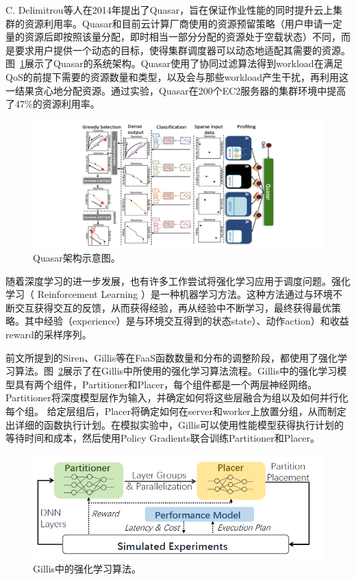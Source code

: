 C. Delimitrou等人在2014年提出了Quasar\parencite{delimitrou2014quasar}，旨在保证作业性能的同时提升云上集群的资源利用率。Quasar和目前云计算厂商使用的资源预留策略（用户申请一定量的资源后即按照该量分配，即时相当一部分分配的资源处于空载状态）不同，而是要求用户提供一个动态的目标，使得集群调度器可以动态地适配其需要的资源。图~\ref{quasar_arch}展示了Quasar的系统架构。Quasar使用了协同过滤算法得到workload在满足QoS的前提下需要的资源数量和类型，以及会与那些workload产生干扰，再利用这一结果贪心地分配资源。通过实验，Quasar在200个EC2服务器的集群环境中提高了47\%的资源利用率。

\begin{figure}[h]
    \centerline{\includegraphics[width=\textwidth]{figures/quasar架构.png}}
    \caption{Quasar架构示意图。}
    \label{quasar_arch}
\end{figure}

随着深度学习的进一步发展，也有许多工作尝试将强化学习应用于调度问题。强化学习（ Reinforcement Learning ）是一种机器学习方法。这种方法通过与环境不断交互获得交互的反馈，从而获得经验，再从经验中不断学习，最终获得最优策略。其中经验（experience）是与环境交互得到的状态state）、动作action）和收益reward的采样序列。

前文所提到的Siren、Gillis等在FaaS函数数量和分布的调整阶段，都使用了强化学习算法。图~\ref{gillis_rf}展示了在Gillis中所使用的强化学习算法流程。Gillis中的强化学习模型具有两个组件，Partitioner和Placer，每个组件都是一个两层神经网络。 Partitioner将深度模型层作为输入，并确定如何将这些层融合为组以及如何并行化每个组。 给定层组后，Placer将确定如何在server和worker上放置分组，从而制定出详细的函数执行计划。在模拟实验中，Gillis可以使用性能模型获得执行计划的等待时间和成本，然后使用Policy Gradients联合训练Partitioner和Placer。

\begin{figure}[h]
    \centerline{\includegraphics[width=\textwidth]{figures/gillis_rf.png}}
    \caption{Gillis中的强化学习算法。}
    \label{gillis_rf}
\end{figure}

